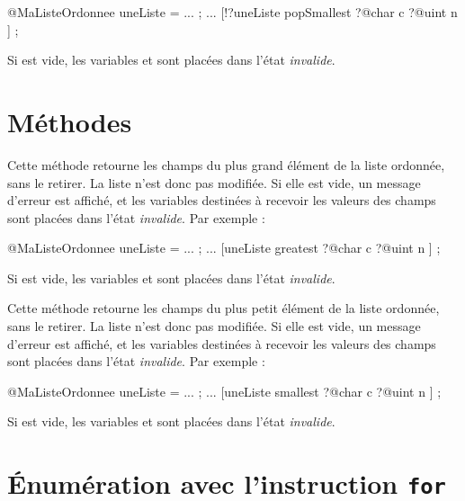 \begin{galgascode}
@MaListeOrdonnee uneListe = ... ;
...
[!?uneListe popSmallest
  ?@char c
  ?@uint n
] ;
\end{galgascode}

Si  est vide, les variables  et  sont placées dans l'état \emph{invalide}.










\section{Méthodes}


Cette méthode retourne les champs du plus grand élément de la liste ordonnée, sans le retirer. La liste n'est donc pas modifiée. Si elle est vide, un message d'erreur est affiché, et les variables destinées à recevoir les valeurs des champs sont placées dans l'état \emph{invalide}. Par exemple :

\begin{galgascode}
@MaListeOrdonnee uneListe = ... ;
...
[uneListe greatest
  ?@char c
  ?@uint n
] ;
\end{galgascode}

Si  est vide, les variables  et  sont placées dans l'état \emph{invalide}.



Cette méthode retourne les champs du plus petit élément de la liste ordonnée, sans le retirer. La liste n'est donc pas modifiée. Si elle est vide, un message d'erreur est affiché, et les variables destinées à recevoir les valeurs des champs sont placées dans l'état \emph{invalide}. Par exemple :

\begin{galgascode}
@MaListeOrdonnee uneListe = ... ;
...
[uneListe smallest
  ?@char c
  ?@uint n
] ;
\end{galgascode}

Si  est vide, les variables  et  sont placées dans l'état \emph{invalide}.




\section{Énumération avec l'instruction \texttt{for}}

